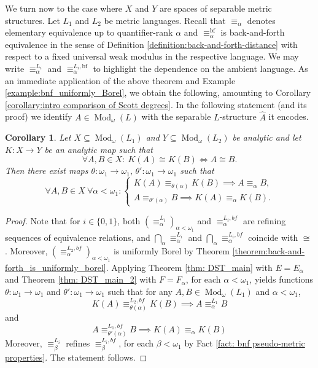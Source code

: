\documentclass[12pt]{amsart}
\newtheorem{corollary}[theorem]{Corollary}
\DeclareMathOperator{\Mod}{Mod}
\begin{document}
We turn now to the case where $X$ and $Y$ are spaces of separable metric structures. Let $L_1$ and $L_2$ be metric languages. Recall that $\equiv_\alpha$ denotes elementary equivalence up to quantifier-rank $\alpha$ and $\equiv_\alpha^{\text{bf}}$ is back-and-forth equivalence in the sense of Definition \ref{definition:back-and-forth-distance} with respect to a fixed universal weak modulus in the respective language. We may write ${\equiv}^{L_i}_\alpha$ and ${\equiv}_\alpha^{L_i,\text{bf}}$ to highlight the dependence on the ambient language. As an immediate application of the above theorem and Example \ref{example:bnf_uniformly_Borel}, we obtain the following, amounting to Corollary \ref{corollary:intro comparison of Scott degrees}. In the following statement (and its proof) we identify $A \in \Mod_\omega(L)$ with the separable $L$-structure $\widehat{A}$ it encodes.

\begin{corollary} \label{cor: infinitary classification}
    Let $X\subseteq\Mod_\omega(L_1)$ and $Y\subseteq\Mod_\omega(L_2)$ be analytic and let $K \colon X\to Y$ be an analytic map such that 
    \[ \forall A,B\in X\colon \ K(A) \cong K(B) \iff A \cong B. \]
    Then there exist maps $\theta\colon\omega_1\to\omega_1, \, \theta'\colon\omega_1\to\omega_1$ such that
    \begin{equation*}
        \forall A,B\in X\ \forall\alpha<\omega_1 \colon
        \begin{cases}
            K(A) \equiv_{\theta(\alpha)} K(B)\implies A\equiv_\alpha B, \\
            A\equiv_{\theta'(\alpha)}B\implies K(A)\equiv_\alpha K(B).
        \end{cases}
    \end{equation*}
\end{corollary}
\begin{proof}
    Note that for $i\in\{0,1\}$, both $({\equiv}^{L_i}_\alpha)_{\alpha<\omega_1}$ and $\equiv_\alpha^{L_i,bf}$ are refining sequences of equivalence relations, and $\bigcap_{\alpha}{\equiv}^{L_i}_\alpha$ and $\bigcap_\alpha \equiv_\alpha^{L_i,bf}$ coincide with $\cong$. Moreover, $(\equiv_\alpha^{L_2,bf})_{\alpha<\omega_1}$ is uniformly Borel by Theorem \ref{theorem:back-and-forth_is_uniformly_borel}. Applying Theorem \ref{thm: DST_main} with $E=E_\alpha$ and Theorem \ref{thm: DST_main_2} with $F=F_\alpha$, for each $\alpha<\omega_1$, yields functions $\theta \colon \omega_1\to\omega_1$ and $\theta' \colon \omega_1\to\omega_1$ such that for any $A,B\in\Mod_\omega(L_1)$ and $\alpha<\omega_1$,
    \[K(A)\equiv_{\theta(\alpha)}^{L_2,bf}K(B)\implies A\equiv^{L_1}_\alpha B\]
    and
    \[A\equiv_{\theta'(\alpha)}^{L_1,bf}B\implies K(A)\equiv_\alpha K(B)\]
    Moreover, $\equiv_\beta^{L_i}$ refines $\equiv_\beta^{L_i,bf}$, for each $\beta<\omega_1$ by Fact \ref{fact: bnf pseudo-metric properties}. The statement follows.
\end{proof}
\end{document}
